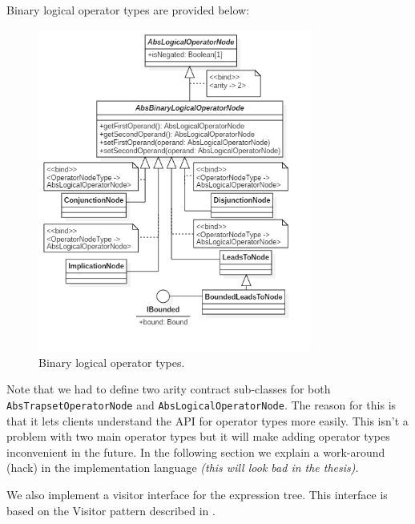 \documentclass[12pt,oneside,a4paper,notitlepage]{report}
\begin{document}
	\newpage

	\par Binary logical operator types are provided below:

	\begin{figure}[h]
		\begin{center}
			\includegraphics[width=0.8\textwidth]
			{Models/LogicalOperatorTypesBinary}
		\end{center}
		\caption{Binary logical operator types.}
		\label{fig:binary-logical-types}
	\end{figure}

	\newpage

	\par Note that we had to define two arity contract sub-classes for both\\
	\texttt{AbsTrapsetOperatorNode} and \texttt{AbsLogicalOperatorNode}. The reason for this is that it lets clients understand the API for operator types more easily. This isn't a problem with two main operator types but it will make adding operator types inconvenient in the future. In the following section we explain a work-around (hack) in the implementation language \textit{(this will look bad in the thesis)}.

	\par We also implement a visitor interface for the expression tree. This interface is based on the Visitor pattern described in \cite{patternbook}.
\end{document}
